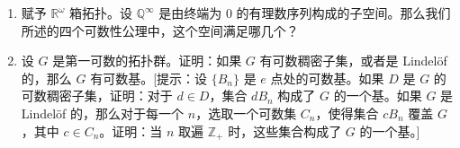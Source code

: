 \begin{enumerate}
(b) 证明：如果 $J$ 的基数大于 $\mathcal{P}(\mathbb{Z}_{+})$，那么积空间 $\mathbb{R}^{J}$ 没有可数稠密子集。[提示：若 $D$ 在 $\mathbb{R}^{J}$ 中稠密，定义 $f\colon J\to\mathcal{P}(D)$ 为 $f(\alpha)=D\cap\pi_{\alpha}^{-1}((a,b))$，其中 $(a,b)$ 是 $\mathbb{R}$ 中的一个固定区间。]
\item 赋予 $\mathbb{R}^{\omega}$ 箱拓扑。设 $\mathbb{Q}^{\infty}$ 是由终端为 $0$ 的有理数序列构成的子空间。那么我们所述的四个可数性公理中，这个空间满足哪几个？
\item 设 $G$ 是第一可数的拓扑群。证明：如果 $G$ 有可数稠密子集，或者是 Lindelöf 的，那么 $G$ 有可数基。[提示：设 $\{B_{n}\}$ 是 $e$ 点处的可数基。如果 $D$ 是 $G$ 的可数稠密子集，证明：对于 $d\in D$，集合 $dB_{n}$ 构成了 $G$ 的一个基。如果 $G$ 是 Lindelöf 的，那么对于每一个 $n$，选取一个可数集 $C_{n}$，使得集合 $cB_{n}$ 覆盖 $G$，其中 $c\in C_{n}$。证明：当 $n$ 取遍 $\mathbb{Z}_{+}$ 时，这些集合构成了 $G$ 的一个基。]
\end{enumerate}